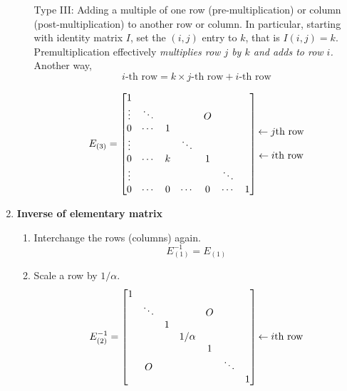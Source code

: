 \begin{enumerate}
\begin{enumerate}
	
	
	
	\item[Type III:]  Adding a multiple of one row (pre-multiplication) or column (post-multiplication) to another row or column.  In particular, starting with identity matrix $I$, set the $(i,j)$ entry to $k$, that is $I(i,j) = k$.  Premultiplication effectively \textit{multiplies row $j$ by $k$ and adds to row $i$.}  Another way, $$i \text{-th row} = k \times j\text{-th row} + i\text{-th row}$$
	
	\[ E_{(3)}= \begin{bmatrix}    1 &   & &    & & &   \\  \vdots &  \ddots & & & O  & & \\  0  & \cdots & 1 & & & &  \\ \vdots & & & \ddots &  & & \\  0 & \cdots  & k & & 1 & & \\ \vdots &  & & & & \ddots & \\ 0 & \cdots & 0 & \cdots & 0 & \cdots & 1   \end{bmatrix}  \begin{matrix} \text{ \; }   \\   \text{ \; }   \\  \leftarrow  j \text{th row}   \\   \text{\;}  \\  \leftarrow i \text{th row}  \\ \text{ \; }  \\ \text{ \; } \end{matrix}  \]
	
	

\end{enumerate}


\item \textbf{Inverse of elementary matrix}
\begin{enumerate}
	\item   Interchange the rows (columns) again. $$E_{(1)}^{-1} = E_{(1)}$$
	 	
	
	\item   Scale a row by $1/ \alpha$.
	\[ E_{(2)}^{-1} = \begin{bmatrix}  1 &  &  &    & & &   \\  &  \ddots & & & O  & & \\ & & 1 & & & &  \\ & & &1/ \alpha & & & \\  & & & & 1 & & \\ & O & & & & \ddots & \\ & & & & & & 1   \end{bmatrix}  \begin{matrix} \text{ \; }   \\   \text{ \; }   \\   \text{ \; }  \\  \leftarrow  i \text{th row}    \\ \text{ \; } \\ \text{ \; }  \\ \text{ \; } \end{matrix}  \]
	

\end{enumerate}
\end{enumerate}

